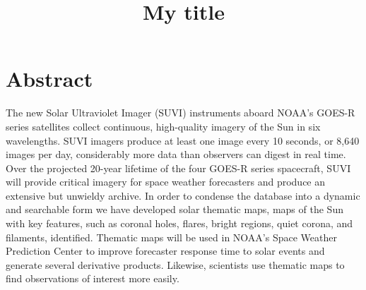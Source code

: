 \documentclass[twoside]{report}
\title{My title}
\begin{document}
\tableofcontents
\listoffigures
\listoftables
\onehalfspacing
\chapter*{Abstract}

The new Solar Ultraviolet Imager (SUVI) instruments aboard NOAA’s GOES-R series satellites collect continuous, high-quality imagery of the Sun in six wavelengths. SUVI imagers produce at least one image every 10 seconds, or 8,640 images per day, considerably more data than observers can digest in real time. Over the projected 20-year lifetime of the four GOES-R series spacecraft, SUVI will provide critical imagery for space weather forecasters and produce an extensive but unwieldy archive. In order to condense the database into a dynamic and searchable form we have developed solar thematic maps, maps of the Sun with key features, such as coronal holes, flares, bright regions, quiet corona, and filaments, identified. Thematic maps will be used in NOAA’s Space Weather Prediction Center to improve forecaster response time to solar events and generate several derivative products. Likewise, scientists use thematic maps to find observations of interest more easily.
\end{document}
